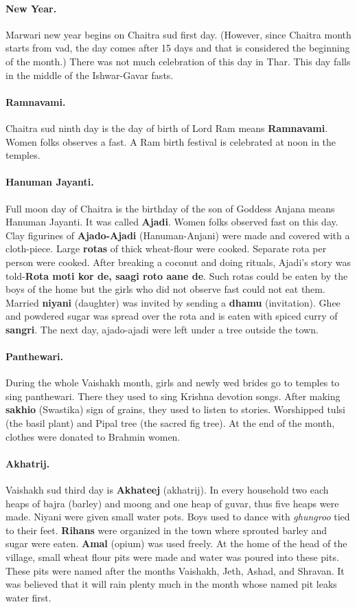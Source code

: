 \paragraph{New Year.} Marwari new year begins on Chaitra sud first day.
(However, since Chaitra month starts from vad, the day comes after 15 days and
that is considered the beginning of the month.) There was not much celebration
of  this day in Thar. This day falls in the middle of the Ishwar-Gavar fasts.
\paragraph{Ramnavami.} Chaitra sud ninth day is the day of birth of Lord Ram
means \textbf{Ramnavami}. Women folks observes a fast. A Ram birth festival
is celebrated at noon in the temples.
\paragraph{Hanuman Jayanti.}
Full moon day of Chaitra is the birthday of the son of Goddess Anjana means
Hanuman Jayanti. It was called \textbf{Ajadi}. Women folks observed fast on
this day. Clay figurines of \textbf{Ajado-Ajadi} (Hanuman-Anjani) were made and
covered with a cloth-piece. Large \textbf{rotas} of thick wheat-flour were
cooked. Separate rota per person were cooked. After breaking a coconut and
doing rituals, Ajadi's story was told-\textbf{Rota moti kor de, saagi roto aane
de}. Such rotas could be eaten by the boys of the home but the girls who did
not observe fast could not eat them. Married \textbf{niyani} (daughter) was
invited by sending a \textbf{dhamu} (invitation). Ghee and powdered sugar was
spread over the rota and is eaten with spiced curry of \textbf{sangri}.
The next day, ajado-ajadi were left under a tree outside the town.

\paragraph{Panthewari.} During the whole Vaishakh month, girls and newly wed
brides go to temples to sing panthewari. There they used to sing Krishna
devotion songs.  After making \textbf{sakhio} (Swastika) sign of grains, they
used to listen to stories. Worshipped tulsi (the basil plant) and Pipal tree
(the sacred fig tree). At the end of the month, clothes were donated to Brahmin
women.
\paragraph{Akhatrij.} Vaishakh sud third day is \textbf{Akhateej}
(akhatrij). In every household two each heaps of bajra (barley) and moong and
one heap of guvar, thus five heaps were made. Niyani were given small water
pots. Boys used to dance with \textit{ghungroo} tied to their feet.
\textbf{Rihans} were organized in the town where sprouted barley and sugar were
eaten. \textbf{Amal} (opium) was used freely. At the home of the head of the
village, small wheat flour pits were made and water was poured into these pits.
These pits were named after the months Vaishakh, Jeth, Ashad, and Shravan. It
was believed that it will rain plenty much in the month whose named pit leaks
water first.
